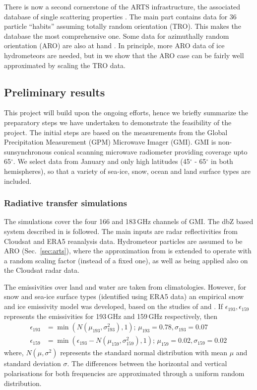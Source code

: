 \documentclass[12pt,oneside,a4paper]{article}
\begin{document}
There is now a second cornerstone of the ARTS infrastructure, the associated
database of single scattering properties \citep{eriksson:agene:18}. The main
part contains data for 36 particle ``habits'' assuming totally random
orientation (TRO). This makes the database the most comprehensive one. Some
data for azimuthally random orientation (ARO) are also at hand
\citep{brath:micro:20}. In principle, more ARO data of ice hydrometeors are
needed, but in \citet{barlakas:intro:21} we show that the ARO case can be
fairly well approximated by scaling the TRO data.

\subsection{Preliminary results}
%
This project will build upon the ongoing efforts, hence we briefly summarize
the preparatory steps we have undertaken to demonstrate the feasibility of the
project. The initial steps are based on the measurements from the Global
Precipitation Measurement (GPM) Microwave Imager (GMI). GMI is
non-sunsynchronous conical scanning microwave radiometer providing coverage
upto 65$^{\circ}$. We select data from January and only high latitudes
(45$^{\circ}$ - 65$^{\circ}$ in both hemispheres), so that a variety of
sea-ice, snow, ocean and land surface types are included.

\subsubsection{Radiative transfer simulations}
%
\label{sec:radiative_transfer}
The simulations cover the four 166 and 183\,GHz channels of GMI. The dbZ based
system described in \citet{ekelund:using:20} is followed. The
main inputs are radar reflectivities from Cloudsat and ERA5 reanalysis data.
Hydrometeor particles are assumed to be ARO (Sec.~\ref{sec:arts}), where the
approximation from \citet{barlakas:intro:21} is extended to operate with 
a random scaling factor (instead of a fixed one), as well as being applied also
on the Cloudsat radar data.

The emissivities over land and water are taken from climatologies. However, for
snow and sea-ice surface types (identified using ERA5 data) an empirical snow
and ice emissivity model was developed, based on the studies of
\citet{harlow:2009:milli} and \citet{hewison:2002:airbo}. If
$\epsilon_{193}, \epsilon_{159}$ represents the emissivities for 193\,GHz and
159\,GHz respectively, then
\begin{align}
\epsilon_{193}& = \min({N(\mu_{193}, \sigma_{193}^{2}), 1});\, \mu_{193} = 0.78, \sigma_{193} = 0.07 \label{eq:1}\\
\epsilon_{159}& = \min(\epsilon_{193} - N(\mu_{159}, \sigma_{159}^{2}), 1) ;\,  \mu_{159} = 0.02, \sigma_{159} = 0.02\,\label{eq:2}
\end{align}
where, $N(\mu, \sigma^{2})$ represents the standard normal distribution with
mean $\mu$ and standard deviation $\sigma$. The differences between the
horizontal and vertical polarisations for both frequencies are 
approximated through a uniform random distribution.
\end{document}
